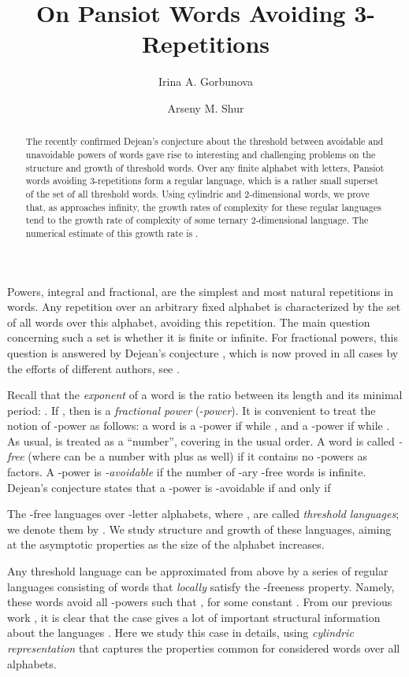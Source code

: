 \documentclass[submission,copyright]{eptcs}\providecommand{\event}{WORDS 2011}
\title{On Pansiot Words Avoiding 3-Repetitions}
\author{Irina A. Gorbunova
\institute{Ural Federal University\\
Ekaterinburg, Russia}
\email{i.a.gorbunova@gmail.com}
\and Arseny M. Shur
\institute{Ural Federal University\\
Ekaterinburg, Russia}
\email{arseny.shur@usu.ru}
}
\begin{document}
\maketitle
{}

\begin{abstract}
The recently confirmed Dejean's conjecture about the threshold between avoidable and un\-avoidable powers of words gave rise to interesting and challenging problems on the structure and growth of threshold words. Over any finite alphabet with  letters, Pansiot words avoiding 3-repetitions form a regular language, which is a rather small superset of the set of all threshold words. Using cylindric and 2-dimensional words, we prove that, as  approaches infinity, the growth rates of complexity for these regular languages tend to the growth rate of complexity of some ternary 2-dimensional language. The numerical estimate of this growth rate is .
\end{abstract}

Powers, integral and fractional, are the simplest and most natural repetitions in words. Any repetition over an arbitrary fixed alphabet is characterized by the set of all words over this alphabet, avoiding this repetition. The main question concerning such a set is whether it is finite or infinite. For fractional powers, this question is answered by Dejean's conjecture \cite{Dej}, which is now proved in all cases by the efforts of different authors, see \cite{Pan,Mou,MNC,Car,CR1,CR2,Rao}.

Recall that the \textit{exponent} of a word  is the ratio between its length and its minimal period: . If , then  is a \textit{fractional power} (-\textit{power}). It is convenient to treat the notion of -power as follows: a word  is a -power if  while , and a -power if  while . As usual,  is treated as a ``number'', covering  in the usual  order. A word is called \textit{-free} (where  can be a number with plus as well) if it contains no -powers as factors. A -power is \textit{-avoidable} if the number of -ary -free words is infinite. Dejean's conjecture states that a -power is -avoidable if and only if

The -free languages over -letter alphabets, where , are called \textit{threshold languages}; we denote them by . We study structure and growth of these languages, aiming at the asymptotic properties as the size of the alphabet increases.

Any threshold language can be approximated from above by a series of regular languages consisting of words that \textit{locally} satisfy the -freeness property. Namely, these words avoid all -powers  such that , for some constant . From our previous work \cite{ShGo}, it is clear that the case  gives a lot of important structural information about the languages . Here we study this case in details, using \textit{cylindric representation} that captures the properties common for considered words over all alphabets.
\end{document}
